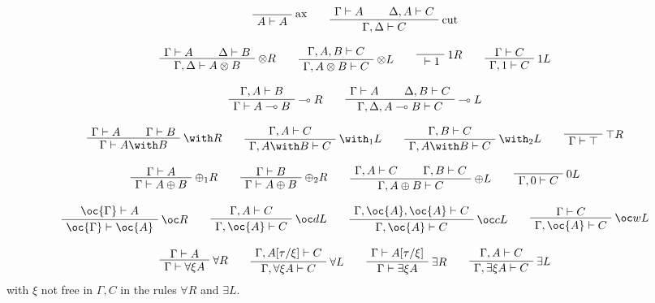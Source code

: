 \begin{gather*}
\LabelRule{\rulename{ax}}
\NulRule{A\vdash A}
\DisplayProof
\qquad
\AxRule{\Gamma\vdash A}
\AxRule{\Delta,A\vdash C}
\LabelRule{\rulename{cut}}
\BinRule{\Gamma,\Delta\vdash C}
\DisplayProof
\\[2ex]
\AxRule{\Gamma\vdash A}
\AxRule{\Delta\vdash B}
\LabelRule{\tens R}
\BinRule{\Gamma,\Delta\vdash A\tens B}
\DisplayProof
\qquad
\AxRule{\Gamma,A,B\vdash C}
\LabelRule{\tens L}
\UnaRule{\Gamma,A\tens B\vdash C}
\DisplayProof
\qquad
\LabelRule{\one R}
\NulRule{{}\vdash\one}
\DisplayProof
\qquad
\AxRule{\Gamma\vdash C}
\LabelRule{\one L}
\UnaRule{\Gamma,\one\vdash C}
\DisplayProof
\\[2ex]
\AxRule{\Gamma,A\vdash B}
\LabelRule{\limp R}
\UnaRule{\Gamma\vdash A\limp B}
\DisplayProof
\qquad
\AxRule{\Gamma\vdash A}
\AxRule{\Delta,B\vdash C}
\LabelRule{\limp L}
\BinRule{\Gamma,\Delta,A\limp B\vdash C}
\DisplayProof
\\[2ex]
\AxRule{\Gamma\vdash A}
\AxRule{\Gamma\vdash B}
\LabelRule{\with R}
\BinRule{\Gamma\vdash A\with B}
\DisplayProof
\qquad
\AxRule{\Gamma,A\vdash C}
\LabelRule{\with_1 L}
\UnaRule{\Gamma,A\with B\vdash C}
\DisplayProof
\qquad
\AxRule{\Gamma,B\vdash C}
\LabelRule{\with_2 L}
\UnaRule{\Gamma,A\with B\vdash C}
\DisplayProof
\qquad
\LabelRule{\top R}
\NulRule{\Gamma\vdash\top}
\DisplayProof
\\[2ex]
\AxRule{\Gamma\vdash A}
\LabelRule{\plus_1 R}
\UnaRule{\Gamma\vdash A\plus B}
\DisplayProof
\qquad
\AxRule{\Gamma\vdash B}
\LabelRule{\plus_2 R}
\UnaRule{\Gamma\vdash A\plus B}
\DisplayProof
\qquad
\AxRule{\Gamma,A\vdash C}
\AxRule{\Gamma,B\vdash C}
\LabelRule{\plus L}
\BinRule{\Gamma,A\plus B\vdash C}
\DisplayProof
\qquad
\LabelRule{\zero L}
\NulRule{\Gamma,\zero\vdash C}
\DisplayProof
\\[2ex]
\AxRule{\oc{\Gamma}\vdash A}
\LabelRule{\oc R}
\UnaRule{\oc{\Gamma}\vdash\oc{A}}
\DisplayProof
\qquad
\AxRule{\Gamma,A\vdash C}
\LabelRule{\oc d L}
\UnaRule{\Gamma,\oc{A}\vdash C}
\DisplayProof
\qquad
\AxRule{\Gamma,\oc{A},\oc{A}\vdash C}
\LabelRule{\oc c L}
\UnaRule{\Gamma,\oc{A}\vdash C}
\DisplayProof
\qquad
\AxRule{\Gamma\vdash C}
\LabelRule{\oc w L}
\UnaRule{\Gamma,\oc{A}\vdash C}
\DisplayProof
\\[2ex]
\AxRule{\Gamma\vdash A}
\LabelRule{\forall R}
\UnaRule{\Gamma\vdash \forall\xi A}
\DisplayProof
\qquad
\AxRule{\Gamma,A[\tau/\xi]\vdash C}
\LabelRule{\forall L}
\UnaRule{\Gamma,\forall\xi A\vdash C}
\DisplayProof
\qquad
\AxRule{\Gamma\vdash A[\tau/\xi]}
\LabelRule{\exists R}
\UnaRule{\Gamma\vdash\exists\xi A}
\DisplayProof
\qquad
\AxRule{\Gamma,A\vdash C}
\LabelRule{\exists L}
\UnaRule{\Gamma,\exists\xi A\vdash C}
\DisplayProof
\end{gather*}
with \(\xi\) not free in \(\Gamma,C\) in the rules \(\forall R\) and \(\exists L\).


